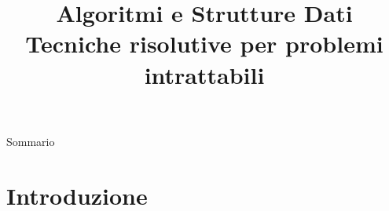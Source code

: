 
\title[ASD - Approssimazione]{\textbf{Algoritmi e Strutture Dati}\\[24pt]Tecniche risolutive per problemi intrattabili}

\usepackage{epigraph}
\usepackage{xcolor}
\usepackage{colortbl}
\usepackage{pdfpages}

\newcommand{\PTIME}{\mbox{\sc $\mathbb{P}$}}
\renewcommand{\NP}{\mbox{$\mathbb{NP}$}}
\newcommand{\TIME}{\mbox{$\mathbb{TIME}$}}
\newcommand{\EXPTIME}{\mbox{$\mathbb{EXPTIME}$}}
\newcommand{\SPACE}{\mbox{$\mathbb{SPACE}$}}
\newcommand{\PSPACE}{\mbox{$\mathbb{PSPACE}$}}

\newcommand{\R}[1]{\textcolor{red}{#1}}
\newcommand{\B}[1]{\textcolor{blue}{#1}}

\newcommand{\Missing}{\mathit{missing}}
\newcommand{\DP}{\mathit{DP}}
\newcommand{\Cost}{\mathit{cost}}
\newcommand{\Transfer}{\mathit{transfer}}
\renewcommand{\Back}{\mathit{last}}



\renewcommand{\arraystretch}{1.4}
\graphicspath{{figs/19/}}
\renewcommand{\enumerazione}{\fontproc{enumeration}}
\newcommand{\isAdmissible}{\fontproc{isAdmissible}}
\newcommand{\isImpossible}{\fontproc{reject}}



\FrameTitle{}

\begin{PlainFrame}{Sommario}
\end{PlainFrame}



\section{Introduzione}


